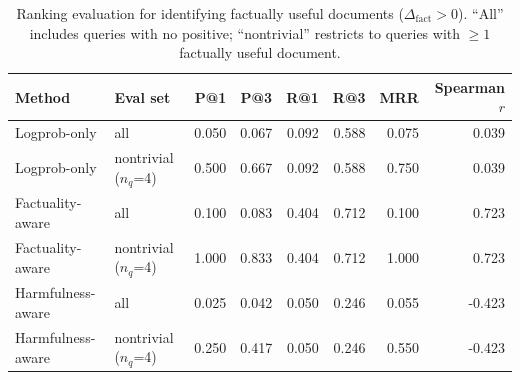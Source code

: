 \begin{table}[h]
\centering\small
\begin{tabular}{llrrrrrr}
\toprule
Method & Eval set & P@1 & P@3 & R@1 & R@3 & MRR & Spearman $r$ \\
\midrule
  Logprob-only & all & 0.050 & 0.067 & 0.092 & 0.588 & 0.075 & 0.039 \\
  Logprob-only & nontrivial ($n_q$=4) & 0.500 & 0.667 & 0.092 & 0.588 & 0.750 & 0.039 \\
  Factuality-aware & all & 0.100 & 0.083 & 0.404 & 0.712 & 0.100 & 0.723 \\
  Factuality-aware & nontrivial ($n_q$=4) & 1.000 & 0.833 & 0.404 & 0.712 & 1.000 & 0.723 \\
  Harmfulness-aware & all & 0.025 & 0.042 & 0.050 & 0.246 & 0.055 & -0.423 \\
  Harmfulness-aware & nontrivial ($n_q$=4) & 0.250 & 0.417 & 0.050 & 0.246 & 0.550 & -0.423 \\
\bottomrule
\end{tabular}
\caption{Ranking evaluation for identifying factually useful documents ($\Delta_{\text{fact}} > 0$). ``All'' includes queries with no positive; ``nontrivial'' restricts to queries with $\geq 1$ factually useful document.}
\label{tab:e6_ranking}
\end{table}
